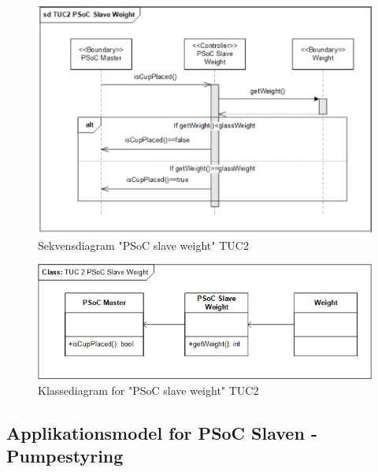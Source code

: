 \begin{figure}[H]
	\centering
	\includegraphics[width=1\textwidth]{Images/Applikationsmodeller/PSoCWeight/Sd_TUC2_PSoC_Slave_Weight_Temporary_Crop.png}
	\caption{Sekvensdiagram "PSoC slave weight" TUC2}
	\label{fig:sdTUC2PSoCSlaveWeight}
\end{figure}

\begin{figure}[H]
	\centering
	\includegraphics[width=1\textwidth]{Images/Applikationsmodeller/PSoCWeight/Class_TUC2_PSoC_Slave_Weight.png}
	\caption{Klassediagram for "PSoC slave weight" TUC2}
	\label{fig:classTUC2PSoCSlaveWeight}
\end{figure}

\subsection{Applikationsmodel for PSoC Slaven - Pumpestyring}
